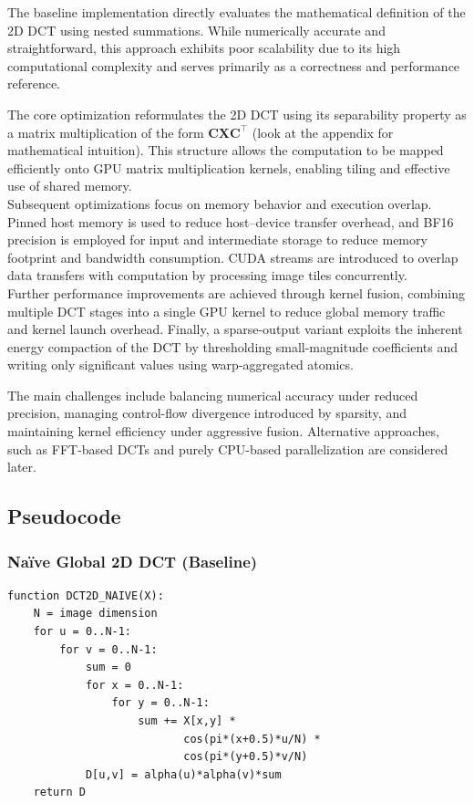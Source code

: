 \documentclass{article}
\begin{document}
The baseline implementation directly evaluates the mathematical definition of the 2D DCT using nested summations. While numerically accurate and straightforward, this approach exhibits poor scalability due to its high computational complexity and serves primarily as a correctness and performance reference.

The core optimization reformulates the 2D DCT using its separability property as a matrix multiplication of the form $\mathbf{C} \mathbf{X} \mathbf{C}^\top$ (look at the appendix for mathematical intuition). This structure allows the computation to be mapped efficiently onto GPU matrix multiplication kernels, enabling tiling and effective use of shared memory. \\

\noindent Subsequent optimizations focus on memory behavior and execution overlap. Pinned host memory is used to reduce host--device transfer overhead, and BF16 precision is employed for input and intermediate storage to reduce memory footprint and bandwidth consumption. CUDA streams are introduced to overlap data transfers with computation by processing image tiles concurrently. \\

\noindent Further performance improvements are achieved through kernel fusion, combining multiple DCT stages into a single GPU kernel to reduce global memory traffic and kernel launch overhead. Finally, a sparse-output variant exploits the inherent energy compaction of the DCT by thresholding small-magnitude coefficients and writing only significant values using warp-aggregated atomics.

The main challenges include balancing numerical accuracy under reduced precision, managing control-flow divergence introduced by sparsity, and maintaining kernel efficiency under aggressive fusion. Alternative approaches, such as FFT-based DCTs and purely CPU-based parallelization are considered later.

\subsection{Pseudocode}

\subsubsection{Naïve Global 2D DCT (Baseline)}

\begin{verbatim}
function DCT2D_NAIVE(X):
    N = image dimension
    for u = 0..N-1:
        for v = 0..N-1:
            sum = 0
            for x = 0..N-1:
                for y = 0..N-1:
                    sum += X[x,y] *
                           cos(pi*(x+0.5)*u/N) *
                           cos(pi*(y+0.5)*v/N)
            D[u,v] = alpha(u)*alpha(v)*sum
    return D
\end{verbatim}
\end{document}
